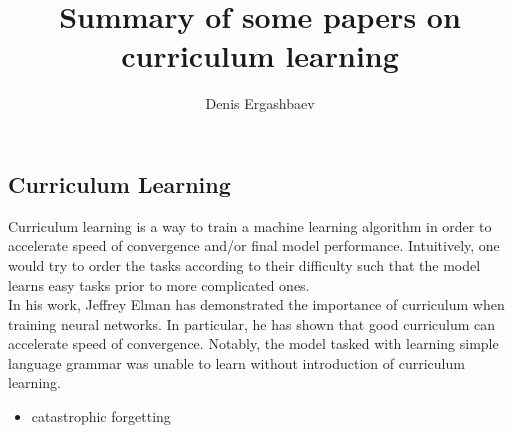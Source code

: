 \documentclass{article}
\title{Summary of some papers on curriculum learning}
\author{Denis Ergashbaev}
\begin{document}
\maketitle


\subsection{Curriculum Learning}

Curriculum learning is a way to train a machine learning algorithm in order to accelerate speed of convergence and/or final model performance. Intuitively, one would try to order the tasks according to their difficulty such that the model learns easy tasks prior to more complicated ones. \\

In his work\cite{elman1993learning}, Jeffrey Elman has demonstrated the importance of curriculum when training neural networks. In particular, he has shown that good curriculum can accelerate speed of convergence. Notably, the model tasked with learning simple language grammar was unable to learn without introduction of curriculum learning. 

\begin{itemize}
	\item catastrophic forgetting 
\end{itemize}



\end{document}
